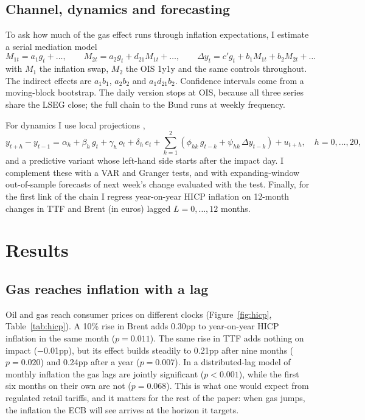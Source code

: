 \documentclass[11pt,a4paper]{article}
\begin{document}
\subsection{Channel, dynamics and forecasting}

To ask how much of the gas effect runs through inflation expectations, I estimate a serial mediation model
\begin{equation}\label{eq:med}
M_{1t} = a_1 g_t + \ldots,\qquad M_{2t} = a_2 g_t + d_{21} M_{1t} + \ldots,\qquad \Delta y_t = c' g_t + b_1 M_{1t} + b_2 M_{2t} + \ldots
\end{equation}
with $M_1$ the inflation swap, $M_2$ the OIS 1y1y and the same controls throughout. The indirect effects are
$a_1 b_1$, $a_2 b_2$ and $a_1 d_{21} b_2$. Confidence intervals come from a moving-block bootstrap. The daily version
stops at OIS, because all three series share the LSEG close; the full chain to the Bund runs at weekly frequency.

For dynamics I use local projections \citep{jorda2005},
\begin{equation}\label{eq:lp}
y_{t+h} - y_{t-1} = \alpha_h + \beta_h\, g_t + \gamma_h\, o_t + \delta_h\, e_t + \sum_{k=1}^{2}\left(\phi_{hk}\, g_{t-k} + \psi_{hk}\, \Delta y_{t-k}\right) + u_{t+h}, \quad h = 0,\ldots,20,
\end{equation}
and a predictive variant whose left-hand side starts after the impact day. I complement these with a VAR and Granger
tests, and with expanding-window out-of-sample forecasts of next week's change evaluated with the
\citet{clarkwest2007} test. Finally, for the first link of the chain I regress year-on-year HICP inflation on 12-month
changes in TTF and Brent (in euros) lagged $L=0,\ldots,12$ months.

\section{Results}\label{sec:results}

\subsection{Gas reaches inflation with a lag}

Oil and gas reach consumer prices on different clocks (Figure~\ref{fig:hicp}, Table~\ref{tab:hicp}). A 10\% rise in
Brent adds 0.30pp to year-on-year HICP inflation in the same month ($p=0.011$). The same rise in TTF adds nothing on
impact ($-$0.01pp), but its effect builds steadily to 0.21pp after nine months ($p=0.020$) and 0.24pp after a year
($p=0.007$). In a distributed-lag model of monthly inflation the gas lags are jointly significant ($p<0.001$), while
the first six months on their own are not ($p=0.068$). This is what one would expect from regulated retail tariffs, and
it matters for the rest of the paper: when gas jumps, the inflation the ECB will see arrives at the horizon it targets.
\end{document}
